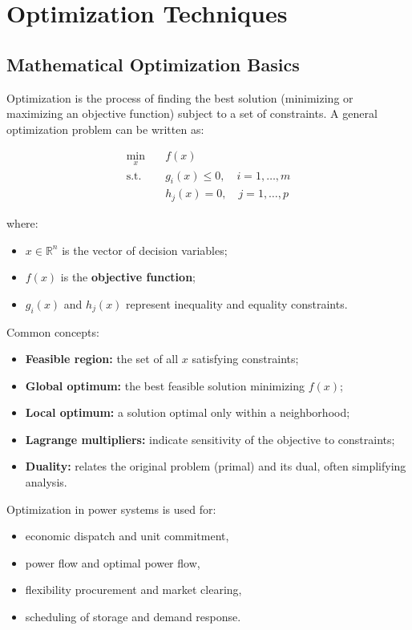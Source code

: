 \documentclass[11pt]{article}
\begin{document}
	
	\section{Optimization Techniques}
	
	\subsection{Mathematical Optimization Basics}
	
	Optimization is the process of finding the best solution (minimizing or maximizing an objective function) subject to a set of constraints.  
	A general optimization problem can be written as:
	
	\[
	\begin{aligned}
		\min_{x} \quad & f(x) \\
		\text{s.t.} \quad & g_i(x) \le 0, \quad i = 1, \ldots, m \\
		& h_j(x) = 0, \quad j = 1, \ldots, p
	\end{aligned}
	\]
	
	where:
	\begin{itemize}
		\item $x \in \mathbb{R}^n$ is the vector of decision variables;
		\item $f(x)$ is the \textbf{objective function};
		\item $g_i(x)$ and $h_j(x)$ represent inequality and equality constraints.
	\end{itemize}
	
	Common concepts:
	\begin{itemize}
		\item \textbf{Feasible region:} the set of all $x$ satisfying constraints;
		\item \textbf{Global optimum:} the best feasible solution minimizing $f(x)$;
		\item \textbf{Local optimum:} a solution optimal only within a neighborhood;
		\item \textbf{Lagrange multipliers:} indicate sensitivity of the objective to constraints;
		\item \textbf{Duality:} relates the original problem (primal) and its dual, often simplifying analysis.
	\end{itemize}
	
	Optimization in power systems is used for:
	\begin{itemize}
		\item economic dispatch and unit commitment,
		\item power flow and optimal power flow,
		\item flexibility procurement and market clearing,
		\item scheduling of storage and demand response.
	\end{itemize}
	
\end{document}
